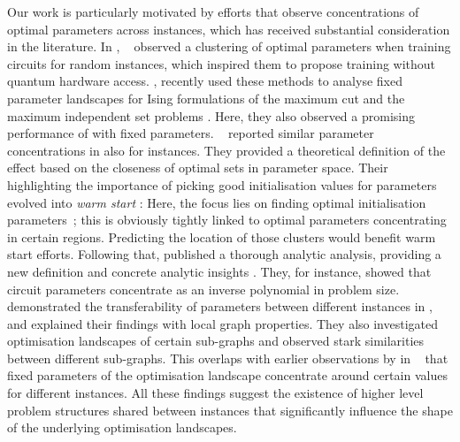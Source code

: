 Our work is particularly motivated by efforts that observe concentrations of optimal \QAOA parameters across instances, which has received substantial consideration in the literature. In \citeyear{streif2020training}, \citeauthor{streif2020training}~\cite{streif2020training} observed a clustering of optimal parameters when training \QAOA circuits for random \maxcut instances, which inspired them to propose
training \QAOA without quantum hardware access. , recently used these methods to analyse fixed parameter \QAOA landscapes for Ising formulations of the maximum cut and the maximum independent set problems \cite{wybo2024missing}. Here, they also observed a promising performance of \QAOA with fixed parameters. \citeauthor{sack2021quantum}~\cite{sack2021quantum} reported similar parameter concentrations in \citeyear{sack2021quantum} also for \maxcut instances. They provided a theoretical definition of the effect based on the closeness of optimal sets in parameter space. Their highlighting the importance of picking good initialisation values for \QAOA parameters evolved into \emph{warm start \QAOA}: Here, the focus lies on finding optimal initialisation parameters~\cite{Egger:2021}; this is obviously tightly linked to optimal parameters concentrating in certain regions. Predicting the location of those clusters would benefit warm start efforts. Following that, \citeauthor{akshay2021parameter} published a thorough analytic analysis, providing a new definition and concrete analytic insights \cite{akshay2021parameter}. They, for instance, showed that \QAOA circuit parameters concentrate as an inverse polynomial in problem size. \citeauthor{galda2similarity}~\cite{galda2similarity} demonstrated the transferability of \QAOA parameters between different \maxcut instances in \citeyear{galda2similarity}, and explained their findings with local graph properties. They also investigated optimisation landscapes of certain sub-graphs and observed stark similarities between different sub-graphs. This overlaps with earlier observations by \citeauthor{brandao2018fixed} in  \citeyear{brandao2018fixed}~\cite{brandao2018fixed} that fixed parameters of the optimisation landscape concentrate around certain values for different instances. All these findings suggest the existence of higher level problem structures shared between instances that significantly influence the shape of the underlying optimisation landscapes. 

